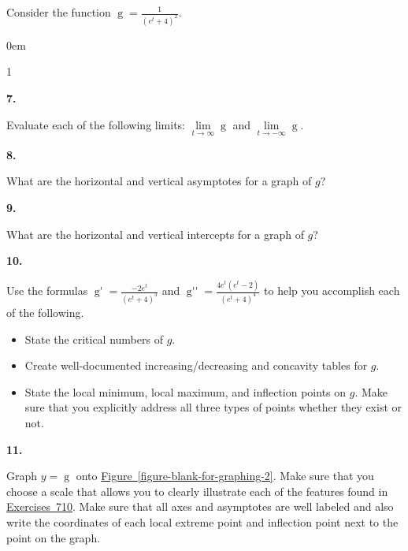 \documentclass[12pt,]{book}
\theoremstyle{plain}
\theoremstyle{definition}
\numberwithin{equation}{section}
\newenvironment{exercisegroup}%
{\medskip\noindent}%
{\par\bigskip}%
\newlength{\exercisegroupindent}%
\newlength{\exercisegroupitemwidth}%
\newenvironment{exercisegrouplist}%
{\vspace{-\partopsep}%
\begin{adjustwidth}{\exercisegroupindent}{0em}}%
{\end{adjustwidth}%
\vspace{-\partopsep}%
\vspace{\baselineskip}}%
\newenvironment{exercisegroupbycol}[1]%
{\begin{exercisegrouplist}%
\vspace{-\multicolsep}%
\begin{multicols}{#1}%
\setlength{\parindent}{0em}%
\setlength{\exercisegroupitemwidth}{\linewidth}}%
{\end{multicols}%
\vspace{-\multicolsep}%
\end{exercisegrouplist}}%
\newenvironment{exercisegroupitem}[1]%
{\begin{minipage}[t]{\exercisegroupitemwidth}
\vspace{0pt}%
{\bfseries#1}%
\rule{0pt}{\baselineskip}}{\strut%
\end{minipage}%
\hspace{\columnsep}}%
\providecommand\phantomsection{}
\newcommand{\fe}[2]{\mathop{{#1}{\left(#2\right)}}}
\newcommand{\fd}[1]{#1'}
\newcommand{\sd}[1]{#1''}
\begin{document}
\begin{exercisegroup}%
Consider the function \(\fe{g}{t}=\frac{1}{(e^t+4)^2}\).%
\par
\begin{exercisegroupbycol}{1}%
\begin{exercisegroupitem}{7. }\phantomsection\hypertarget{exercise-sketch-second-asymptotes}{\null}
Evaluate each of the following limits: \(\lim\limits_{t\to\infty}\fe{g}{t}\) and \(\lim\limits_{t\to-\infty}\fe{g}{t}\).%
\end{exercisegroupitem}%
\par%
\begin{exercisegroupitem}{8. }\phantomsection\hypertarget{exercise-456}{\null}
What are the horizontal and vertical asymptotes for a graph of \(g\)?%
\end{exercisegroupitem}%
\par%
\begin{exercisegroupitem}{9. }\phantomsection\hypertarget{exercise-457}{\null}
What are the horizontal and vertical intercepts for a graph of \(g\)?%
\end{exercisegroupitem}%
\par%
\begin{exercisegroupitem}{10. }\phantomsection\hypertarget{exercise-sketch-second-critical-numbers}{\null}
Use the formulas \(\fe{\fd{g}}{t}=\frac{-2e^t}{(e^t+4)^3}\) and \(\fe{\sd{g}}{t}=\frac{4e^t(e^t-2)}{(e^t+4)^4}\) to help you accomplish each of the following.%
\begin{itemize}[label=\textbullet]
\item{}State the critical numbers of \(g\).\item{}Create well-documented increasing/decreasing and concavity tables for \(g\).\item{}State the local minimum, local maximum, and inflection points on \(g\).  Make sure that you explicitly address all three types of points whether they exist or not.\end{itemize}
\end{exercisegroupitem}%
\par%
\begin{exercisegroupitem}{11. }\phantomsection\hypertarget{exercise-459}{\null}
Graph \(y=\fe{g}{t}\) onto \hyperref[figure-blank-for-graphing-2]{Figure~\ref*{figure-blank-for-graphing-2}}. Make sure that you choose a scale that allows you to clearly illustrate each of the features found in \hyperref[exercise-sketch-second-asymptotes]{Exercises~7}\textendash{}\hyperref[exercise-sketch-second-critical-numbers]{10}.  Make sure that all axes and asymptotes are well labeled and also write the coordinates of each local extreme point and inflection point next to the point on the graph.%

\end{exercisegroupitem}
\end{exercisegroupbycol}
\end{exercisegroup}
\end{document}
